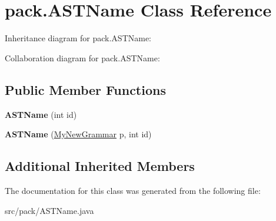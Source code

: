 \hypertarget{classpack_1_1_a_s_t_name}{}\section{pack.\+A\+S\+T\+Name Class Reference}
\label{classpack_1_1_a_s_t_name}


Inheritance diagram for pack.\+A\+S\+T\+Name\+:


Collaboration diagram for pack.\+A\+S\+T\+Name\+:
\subsection*{Public Member Functions}
\begin{DoxyCompactItemize}
\item 
{\bfseries A\+S\+T\+Name} (int id)\hypertarget{classpack_1_1_a_s_t_name_a512321614bb6e473bfd87283dc4cd7c5}{}\label{classpack_1_1_a_s_t_name_a512321614bb6e473bfd87283dc4cd7c5}

\item 
{\bfseries A\+S\+T\+Name} (\hyperlink{classpack_1_1_my_new_grammar}{My\+New\+Grammar} p, int id)\hypertarget{classpack_1_1_a_s_t_name_a49f41d4c63b748fa6e7320808194140f}{}\label{classpack_1_1_a_s_t_name_a49f41d4c63b748fa6e7320808194140f}

\end{DoxyCompactItemize}
\subsection*{Additional Inherited Members}


The documentation for this class was generated from the following file\+:\begin{DoxyCompactItemize}
\item 
src/pack/A\+S\+T\+Name.\+java\end{DoxyCompactItemize}
